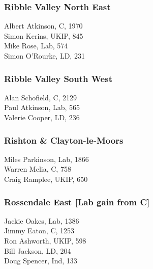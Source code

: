 \documentclass[a4paper,openany,10pt]{book}
\begin{document}
\subsubsection*{Ribble Valley North East}



Albert Atkinson, C, 1970\\
Simon Kerins, UKIP, 845\\
Mike Rose, Lab, 574\\
Simon O'Rourke, LD, 231\\


\subsubsection*{Ribble Valley South West}



Alan Schofield, C, 2129\\
Paul Atkinson, Lab, 565\\
Valerie Cooper, LD, 236\\


\subsubsection*{Rishton \& Clayton-le-Moors}



Miles Parkinson, Lab, 1866\\
Warren Melia, C, 758\\
Craig Ramplee, UKIP, 650\\


\subsubsection*{Rossendale East \hspace*{\fill}\nolinebreak[1]%
\enspace\hspace*{\fill}
[Lab gain from C]}



Jackie Oakes, Lab, 1386\\
Jimmy Eaton, C, 1253\\
Ron Ashworth, UKIP, 598\\
Bill Jackson, LD, 204\\
Doug Spencer, Ind, 133\\
\end{document}
